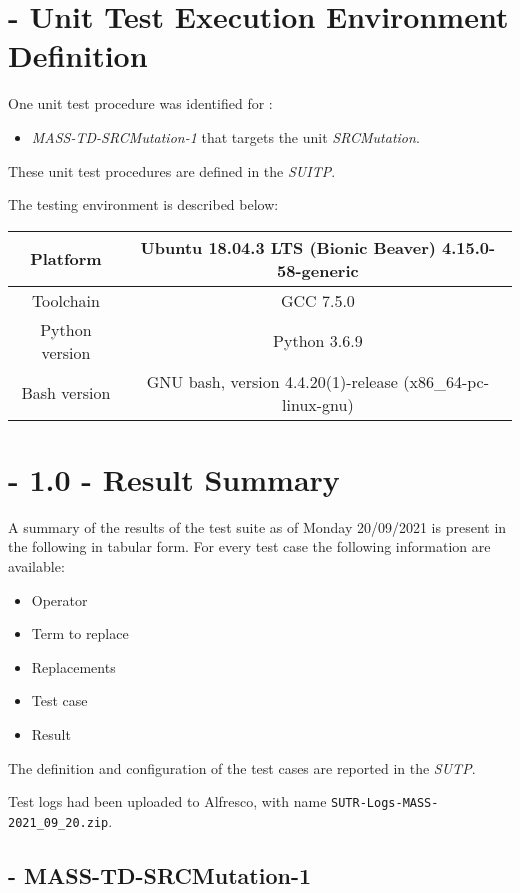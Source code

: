 
\chapter{\MASS{} - Unit Test Execution Environment Definition}

One unit test procedure was identified for \MASS:
\begin{itemize}
  \item {\emph{MASS-TD-SRCMutation-1}} that targets the unit \emph{SRCMutation}.
\end{itemize}

These unit test procedures are defined in the \emph{SUITP}.

The testing environment is described below:

\begin{center}
\begin{tabular}{ |c|c| }
 \hline
 Platform & Ubuntu 18.04.3 LTS (Bionic Beaver) 4.15.0-58-generic \\
 \hline
 Toolchain & GCC 7.5.0 \\
 \hline
 Python version & Python 3.6.9 \\
 \hline
 Bash version & GNU bash, version 4.4.20(1)-release (x86\_64-pc-linux-gnu) \\
 \hline
\end{tabular}
\end{center}


\chapter{\MASS{} - 1.0 - Result Summary}


A summary of the results of the test suite as of Monday 20/09/2021 is present in the following in tabular form.
For every test case the following information are available:
\begin{itemize}
  \item Operator
  \item Term to replace
  \item Replacements
  \item Test case
  \item Result
\end{itemize}

The definition and configuration of the test cases are reported in the \emph{SUTP}.

Test logs had been uploaded to Alfresco, with name \texttt{SUTR-Logs-MASS-2021\_09\_20.zip}.

\section{\MASS - MASS-TD-SRCMutation-1}



\clearpage
